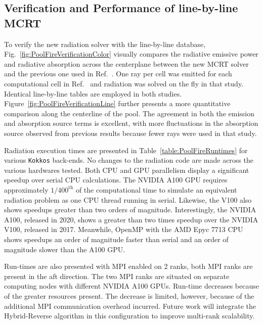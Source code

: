 \subsection{Verification and Performance of line-by-line MCRT}
To verify the new radiation solver with the line-by-line database,
Fig.~\ref{fig:PoolFireVerificationColor} visually compares the radiative emissive power and radiative absorption across the centerplane between the new MCRT solver and the previous one used in Ref.~\cite{Wu2020DetailedFire}. One ray per cell was emitted for each computational cell in Ref.~\cite{Wu2020DetailedFire} and radiation was solved on the fly in that study. Identical line-by-line tables are employed in both studies. 
Figure~\ref{fig:PoolFireVerificationLine} further presents a more quantitative comparison along the centerline of the pool. The agreement in both the emission and absorption source terms is excellent, with more fluctuations in the absorption source observed from previous results because fewer rays were used in that study. 

Radiation execution times are presented in Table~\ref{table:PoolFireRuntimes} for various \texttt{Kokkos} back-ends. No changes to the radiation code are made across the various hardwares tested. Both CPU and GPU parallelism display a significant speedup over serial CPU calculations.
The NVIDIA A100 GPU requires approximately $1/400^{\text{th}}$ of the computational time to simulate an equivalent radiation problem as one CPU thread running in serial. Likewise, the V100 also shows speedups greater than two orders of magnitude. Interestingly, the NVIDIA A100, released in 2020, shows a greater than two times speedup over the NVIDIA V100, released in 2017. Meanwhile, OpenMP with the AMD Epyc 7713 CPU shows speedups an order of magnitude faster than serial and an order of magnitude slower than the A100 GPU.

Run-times are also presented with MPI enabled on 2 ranks, both MPI ranks are present in the aft direction. The two MPI ranks are situated on separate computing nodes with different NVIDIA A100 GPUs. Run-time decreases because of the greater resources present. The decrease is limited, however, because of the additional MPI communication overhead incurred. Future work will integrate the Hybrid-Reverse algorithm in this configuration to improve multi-rank scalability.

